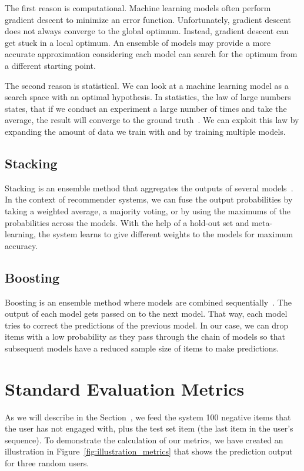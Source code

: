 The first reason is computational. Machine learning models often perform gradient descent to minimize an error function. Unfortunately, gradient descent does not always converge to the global optimum. Instead, gradient descent can get stuck in a local optimum. An ensemble of models may provide a more accurate approximation considering each model can search for the optimum from a different starting point.

The second reason is statistical. We can look at a machine learning model as a search space with an optimal hypothesis. In statistics, the law of large numbers states, that if we conduct an experiment a large number of times and take the average, the result will converge to the ground truth~\cite{ibe2013markov}. We can exploit this law by expanding the amount of data we train with and by training multiple models. 

\subsection{Stacking}
Stacking is an ensemble method that aggregates the outputs of several models~\cite{geron2019hands}. In the context of recommender systems, we can fuse the output probabilities by taking a weighted average, a majority voting, or by using the maximums of the probabilities across the models. With the help of a hold-out set and meta-learning, the system learns to give different weights to the models for maximum accuracy.

\subsection{Boosting}
Boosting is an ensemble method where models are combined sequentially~\cite{geron2019hands}. The output of each model gets passed on to the next model. That way, each model tries to correct the predictions of the previous model. In our case, we can drop items with a low probability as they pass through the chain of models so that subsequent models have a reduced sample size of items to make predictions.


\section{Standard Evaluation Metrics}\label{sec:standard_metrics}

As we will describe in the Section~, we feed the system 100 negative items that the user has not engaged with, plus the test set item (the last item in the user’s sequence). To demonstrate the calculation of our metrics, we have created an illustration in Figure~\ref{fig:illustration_metrics} that shows the prediction output for three random users.

